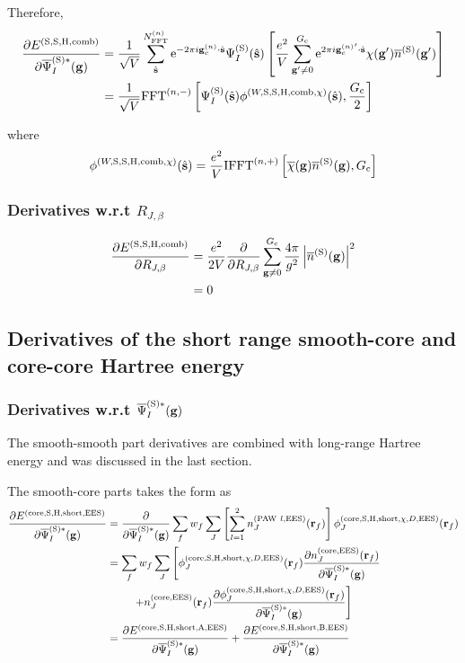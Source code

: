 \documentclass[paper=a4, fontsize=11pt]{article} %
\numberwithin{equation}{section} %
\numberwithin{figure}{section} %
\numberwithin{table}{section} %
\newcommand{\p}{\partial}
\newcommand{\ol}{\overline}
\newcommand{\bs}{{\bf{s}}}
\newcommand{\bg}{{\bf{g}}}
\newcommand{\br}{{\bf{r}}}
\newcommand{\hs}{{\hat{\bf{s}}}}
\newcommand{\rS}{{\mathrm{S}}}
\newcommand{\rEES}{{\mathrm{EES}}}
\newcommand{\rcore}{{\mathrm{core}}}
\newcommand{\re}{{\mathrm{e}}}
\newcommand{\rshort}{{\mathrm{short}}}
\newcommand{\rP}{{\mathrm{PAW}}}
\newcommand{\rH}{{\mathrm{H}}}
\newcommand{\rA}{{\mathrm{A}}}
\newcommand{\rB}{{\mathrm{B}}}
\newcommand{\rcomb}{{\mathrm{comb}}}
\newcommand{\gcn}{{\bg_c^{(n)}}}
\newcommand{\igcns}{2\pi i\gcn\cdot\hat \bs}
\newcommand{\igpcns}{2\pi i\gcn'\cdot\hat \bs}
\newcommand{\psigsc}{{\overline \Psi_I^{(\rS)*}(\bg)}}
\newcommand{\RJb}{{R_{J,\beta}}}
\newcommand{\NFFTn}{{N^{(n)}_{\mathrm{FFT}}}}
\newcommand{\Gc}{{G_{\mathrm{c}}}}
\newcommand{\hGc}{{\frac{G_{\mathrm{c}}}{2}}}
\newcommand{\IFFTn}{{\mathrm{IFFT}^{(n,+)}}}
\newcommand{\FFTni}{{\mathrm{FFT}^{(n,-)}}}
\begin{document}
Therefore,
\begin{equation}
\begin{split}
\frac{\p E^{(\rS,\rS,\rH,\rcomb)}}{\p \psigsc}
&= \frac{1}{\sqrt V} \sum_{\hat \bs}^\NFFTn   \re^{-\igcns}\Psi_{I}^{(\rS)} (\hat \bs) \left[\frac{e^2}{V} \sum_{\bg' \neq 0}^\Gc \re^{\igpcns} \chi(\bg') \overline{n}^{(\rS)}(\bg')\right]\\
&= \frac{1}{\sqrt V} \FFTni \left[ \Psi_{I}^{(\rS)} (\hat \bs) \phi^{(W,\rS,\rS,\rH,\rcomb,\chi)}(\hs),\hGc \right]\\
\end{split}
\end{equation}

where
\begin{equation}
\phi^{(W,\rS,\rS,\rH,\rcomb,\chi)}(\hs) = \frac{e^2}{V} \IFFTn \left[\ol \chi(\bg) \ol{n}^{(\rS)}(\bg),\Gc \right]
\end{equation}

\subsubsection{Derivatives w.r.t $\RJb$}
\begin{equation}
\begin{split}
\frac{\p E^{(\rS,\rS,\rH,\rcomb)}}{\p \RJb}
&=\frac{e^2}{2V} \frac{\p}{\p \RJb}\sum_{\bg \neq 0}^\Gc \frac{4\pi}{g^2}\left|\ol{n}^{(\rS)}(\bg)\right|^2\\
&=0
\end{split}
\end{equation}
\newpage

\subsection{Derivatives of the short range smooth-core and core-core Hartree energy}
\subsubsection{Derivatives w.r.t $\psigsc$}

The smooth-smooth part derivatives are combined with long-range Hartree energy and was discussed in the last section.

The smooth-core parts takes the form as
\begin{equation}\label{eq:dEHSldp}
\begin{split}
\frac{\p E^{(\rcore,\rS,\rH,\rshort,\rEES)}}{\p \psigsc}
&= \frac{\p }{\p \psigsc}\sum_f w_f \sum_J \left[\sum_{l=1}^2  n_J^{(\rP\ l,\rEES)}(\br_f) \right] \phi_J^{(\rcore,\rS,\rH,\rshort,\chi,D,\rEES)}(\br_f) \\
&= \sum_f w_f \sum_J \left[\phi_J^{(\rcore,\rS,\rH,\rshort,\chi,D,\rEES)}(\br_f)\frac{\p n_J^{(\rcore,\rEES)}(\br_f)}{\p \psigsc} \right.\\
&\left. \ \ \ \ \ \ \ +n_J^{(\rcore,\rEES)}(\br_f) \frac{\p \phi_J^{(\rcore,\rS,\rH,\rshort,\chi,D,\rEES)}(\br_f)}{\p \psigsc}\right]\\
& = \frac{\p E^{(\rcore,\rS,\rH,\rshort,\rA,\rEES)}}{\p \psigsc} + \frac{\p E^{(\rcore,\rS,\rH,\rshort,\rB,\rEES)}}{\p \psigsc}
\end{split}
\end{equation}
\end{document}

